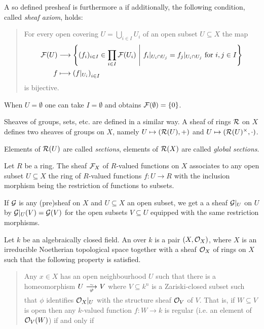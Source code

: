 \documentclass[a4paper,parskip=full,numbers=enddot]{scrreprt}
\begin{document}
\begin{defi}
    A so defined presheaf is furthermore a  if additionally, the following condition, called \emph{sheaf axiom}, holds:
    \begin{quote}
     For every open covering $U = \bigcup_{i\in I} U_i$ of an open subset $U\subseteq X$ the map
        \begin{align*}\lbl{eq:sheafAxiom}
			\Ff(U) &\longto \left\{(f_i)_{i\in I}\in \prod_{i\in I} \Ff (U_i)\st f_i|_{U_i\cap U_j} = f_j|_{U_i\cap U_j} \text{ for }i,j\in I\right\}\\
			f &\longmapsto \left(f|_{U_i}\right)_{i\in I}
        \end{align*}
        is bijective.
    \end{quote}
\begin{rem}
    When $U=\emptyset$ one can take $I=\emptyset$ and obtains $\mathcal{F}(\emptyset) = \{0\}$.
\end{rem}
\begin{rem}
    Sheaves of groups, sets, etc. are defined in a similar way. A sheaf of rings $\mathcal{R}$ on $X$ defines two sheaves of groups on $X$, namely $U\mapsto (\mathcal{R}(U), +)$ and $U\mapsto (\mathcal{R}(U)^\times, \cdot)$.
\end{rem}
\begin{rem}
    Elements of $\mathcal{R}(U)$ are called \emph{sections}, elements of $\mathcal{R}(X)$ are called \emph{global sections}.
\end{rem}
\begin{example}
    Let $R$ be a ring. The sheaf $\mathcal{F}_X$ of $R$-valued functions on $X$ associates to any open subset $U\subseteq X$ the ring of $R$-valued functions $f\colon U \to R$ with the inclusion morphism being the restriction of functions to subsets.
\end{example}
\begin{rem*}
  If $\mathcal{G}$ is any (pre)sheaf on $X$ and $U\subseteq X$ an open subset, we get a a sheaf $\mathcal{G}|_U$ on $U$ by $\mathcal{G}|_U(V) = \mathcal{G}(V)$ for the open subsets $V\subseteq U$ equipped with the same restriction morphisms.
\end{rem*}
\begin{defi} 
    Let $k$ be an algebraically closed field. An  over $k$ is a pair $(X,\mathcal{O}_X)$, where $X$ is an irreducible Noetherian topological space together with a sheaf $\mathcal{O}_X$ of rings on $X$ such that the following property is satisfied.
    \begin{quote}
        Any $x\in X$ has an open neighbourhood $U$ such that there is a homeomorphism $U\isomorphism[\phi] V$ where $V\subseteq k^n$ is a Zariski-closed subset such that $\phi$ identifies $\mathcal{O}_X|_U$ with the structure sheaf $\mathcal{O}_V$ of $V$. That is, if $W \subseteq V$ is open then any $k$-valued function $f\colon W\to k$ is regular (i.e. an element of $\mathcal{O}_V(W)$) if and only if 

\end{quote}
\end{defi}
\end{defi}
\end{document}
